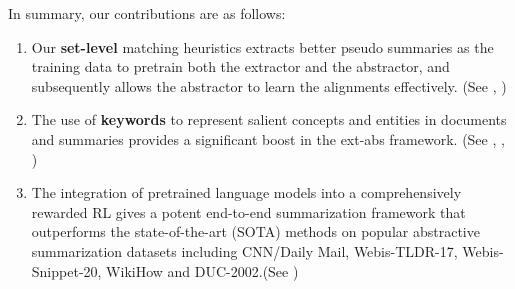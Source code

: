 In summary, our contributions are as follows:
\begin{enumerate}
\item Our \textbf{set-level} matching heuristics extracts better 
pseudo summaries as the training data to pretrain both the extractor 
and the abstractor, and subsequently allows the abstractor 
to learn the alignments effectively. (See ,
)
\item The use of \textbf{keywords} to represent salient concepts and 
entities in documents and summaries provides a significant boost 
in the ext-abs framework. 
(See , , )
\item The integration of pretrained language models into a comprehensively
rewarded RL gives a potent end-to-end summarization framework that
outperforms the state-of-the-art (SOTA) methods on 
popular abstractive summarization datasets including CNN/Daily Mail, Webis-TLDR-17, Webis-Snippet-20, 
WikiHow and DUC-2002.(See )
\end{enumerate}
